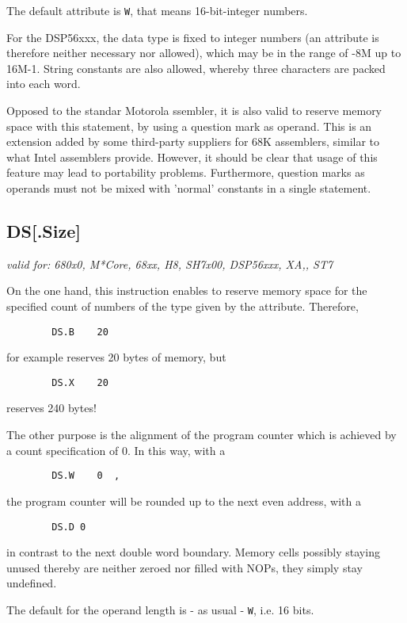 \documentclass[12pt,twoside]{report}
\makeatletter
\newcommand{\tty}[1]{{\tt #1}}
\newcommand{\ttindex}[1]{\index{#1@{\tt #1}}}
\makeatother
\begin{document}
The default attribute is \tty{W}, that means 16-bit-integer numbers.

For the DSP56xxx, the data type is fixed to integer numbers (an attribute is 
therefore neither necessary nor allowed), which may be in the range
of -8M up to 16M-1.  String constants are also allowed, whereby three characters 
are packed into each word.

Opposed to the standar Motorola ssembler, it is also valid to reserve
memory space with this statement, by using a question mark as operand. 
This is an extension added by some third-party suppliers for 68K
assemblers, similar to what Intel assemblers provide.  However, it should
be clear that usage of this feature may lead to portability problems. 
Furthermore, question marks as operands must not be mixed with 'normal'
constants in a single statement.


\subsection{DS[.Size]}
\ttindex{DS}

{\em valid for: 680x0, M*Core, 68xx, H8, SH7x00, DSP56xxx, XA,, ST7}

On the one hand, this instruction enables to reserve memory space for
the specified count of numbers of the type given by the attribute. 
Therefore, 
\begin{verbatim}
        DS.B    20
\end{verbatim}
for example reserves 20 bytes of memory, but
\begin{verbatim}
        DS.X    20
\end{verbatim}
reserves 240 bytes!

The other purpose is the alignment of the program counter which is
achieved by a count specification of 0.  In this way, with a
\begin{verbatim}
        DS.W    0  ,
\end{verbatim}
the program counter will be rounded up to the next even address, with
a
\begin{verbatim}
        DS.D 0
\end{verbatim}
in contrast to the next double word boundary.  Memory cells possibly
staying unused thereby are neither zeroed nor filled with NOPs, they
simply stay undefined. 

The default for the operand length is - as usual - \tty{W}, i.e. 16 bits.
\end{document}
